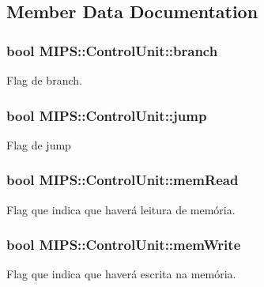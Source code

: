 \subsection{Member Data Documentation}
\subsubsection[{\texorpdfstring{branch}{branch}}]{\setlength{\rightskip}{0pt plus 5cm}bool M\+I\+P\+S\+::\+Control\+Unit\+::branch}\hypertarget{classMIPS_1_1ControlUnit_aa19c9a24c47bdde835e273e81a485e28}{}\label{classMIPS_1_1ControlUnit_aa19c9a24c47bdde835e273e81a485e28}
Flag de branch. 
\subsubsection[{\texorpdfstring{jump}{jump}}]{\setlength{\rightskip}{0pt plus 5cm}bool M\+I\+P\+S\+::\+Control\+Unit\+::jump}\hypertarget{classMIPS_1_1ControlUnit_a13c01a649cd685fc1a52e3c3c45e96e7}{}\label{classMIPS_1_1ControlUnit_a13c01a649cd685fc1a52e3c3c45e96e7}
Flag de jump 
\subsubsection[{\texorpdfstring{mem\+Read}{memRead}}]{\setlength{\rightskip}{0pt plus 5cm}bool M\+I\+P\+S\+::\+Control\+Unit\+::mem\+Read}\hypertarget{classMIPS_1_1ControlUnit_abe9e61b37cb75b89cdde98446d89e89d}{}\label{classMIPS_1_1ControlUnit_abe9e61b37cb75b89cdde98446d89e89d}
Flag que indica que haverá leitura de memória. 
\subsubsection[{\texorpdfstring{mem\+Write}{memWrite}}]{\setlength{\rightskip}{0pt plus 5cm}bool M\+I\+P\+S\+::\+Control\+Unit\+::mem\+Write}\hypertarget{classMIPS_1_1ControlUnit_aba0c87c1f08276807cd241a9484980bc}{}\label{classMIPS_1_1ControlUnit_aba0c87c1f08276807cd241a9484980bc}
Flag que indica que haverá escrita na memória. 
